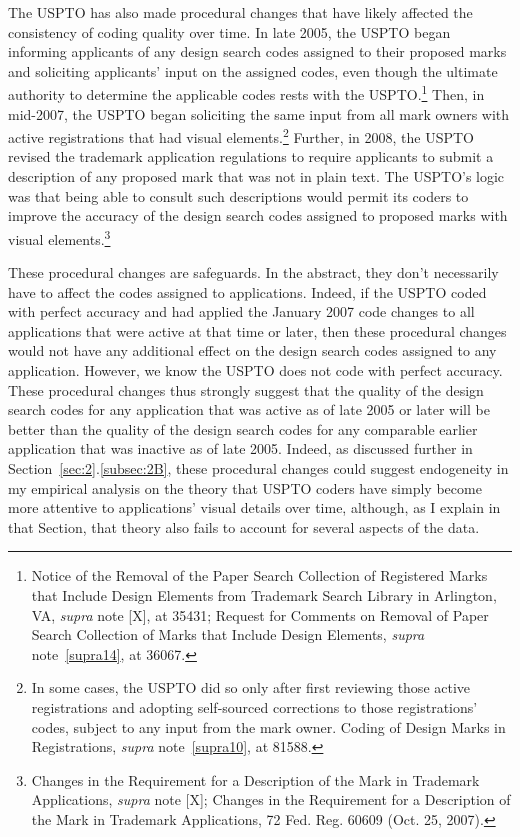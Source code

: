 \documentclass[letterpaper, 11pt, oneside]{article}
\begin{document}
\begin{enumerate}
The USPTO has also made procedural changes that have likely affected the consistency of coding quality over time. In late 2005, the USPTO began informing applicants of any design search codes assigned to their proposed marks and soliciting applicants' input on the assigned codes, even though the ultimate authority to determine the applicable codes rests with the USPTO.\footnote{\label{supra27} Notice of the Removal of the Paper Search Collection of Registered Marks that Include Design Elements from Trademark Search Library in Arlington, VA, \textit{supra} note [X], at 35431; Request for Comments on Removal of Paper Search Collection of Marks that Include Design Elements, \textit{supra} note~\ref{supra14}, at 36067.} Then, in mid-2007, the USPTO began soliciting the same input from all mark owners with active registrations that had visual elements.\footnote{In some cases, the USPTO did so only after first reviewing those active registrations and adopting self-sourced corrections to those registrations' codes, subject to any input from the mark owner. Coding of Design Marks in Registrations, \textit{supra} note~\ref{supra10}, at 81588.} Further, in 2008, the USPTO revised the trademark application regulations to require applicants to submit a description of any proposed mark that was not in plain text. The USPTO's logic was that being able to consult such descriptions would permit its coders to improve the accuracy of the design search codes assigned to proposed marks with visual elements.\footnote{Changes in the Requirement for a Description of the Mark in Trademark Applications, \textit{supra} note [X]; Changes in the Requirement for a Description of the Mark in Trademark Applications, 72 Fed. Reg. 60609 (Oct. 25, 2007).}

These procedural changes are safeguards. In the abstract, they don't necessarily have to affect the codes assigned to applications. Indeed, if the USPTO coded with perfect accuracy and had applied the January 2007 code changes to all applications that were active at that time or later, then these procedural changes would not have any additional effect on the design search codes assigned to any application. However, we know the USPTO does not code with perfect accuracy. These procedural changes thus strongly suggest that the quality of the design search codes for any application that was active as of late 2005 or later will be better than the quality of the design search codes for any comparable earlier application that was inactive as of late 2005. Indeed, as discussed further in Section~\ref{sec:2}.\ref{subsec:2B}, these procedural changes could suggest endogeneity in my empirical analysis on the theory that USPTO coders have simply become more attentive to applications' visual details over time, although, as I explain in that Section, that theory also fails to account for several aspects of the data.

\end{enumerate}
\end{document}

